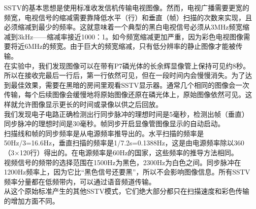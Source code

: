 SSTV的基本思想是使用标准收发信机传输电视图像。然而，电视广播需要更宽的频宽，电视信号的缩减需要靠降低水平（行）和垂直（帧）扫描的次数来实现，且必须缩减到最少的频率。这就意味着一个典型的黑白电视信号必须从3MHz频宽缩减到3kHz——缩减率接近1000：1。如今频宽缩减更加严重，因为彩色电视图像需要将近6MHz的频宽。由于巨大的频宽缩减，只有低分辨率的静止图像才能被传输。\\

在实验中，我们发现图像可以在带有P7磷光体的长余辉显像管上保持可见约8秒。所以在接收完最后一行后，第一行依然可见，但在一段时间内会慢慢消失。为了达到最佳效果，需要在黑暗的房间里观看SSTV显示器。通常几个相同的图像会一次传输，每个后续图像会缓慢地将原始图像还原在磷光体上，原始图像依然可见。这样就允许图像显示更长的时间或录像以供之后回放。\\

我们发现电子电路正确检测出行同步脉冲的理想时间是5毫秒，检测出帧（垂直）同步脉冲的理想时间是30毫秒。帧同步开启显像管图像显示的自动启动。\\

扫描线和帧的同步频率是从电源频率推导出的。水平扫描的频率是50Hz/3=16.6Hz，垂直扫描的频率是1/7.2s=0.1388Hz，这是由电源频率除以360（3×120行）得出的。在电源频率是60Hz的国家，这些频率的推导方法相同。\\

视频信号的频带的选择范围在1500Hz为黑色，2300Hz为白色之间。同步脉冲在1200Hz频率上，因为它比“黑色信号还要黑”，所以不会影响图像信息。所有SSTV频率分量都在低频带内，可以通过语音频道传输。\\

从这个原始标准产生的其他SSTV模式，它们绝大部分都只在扫描速度和彩色传输的增加方面不同。\\